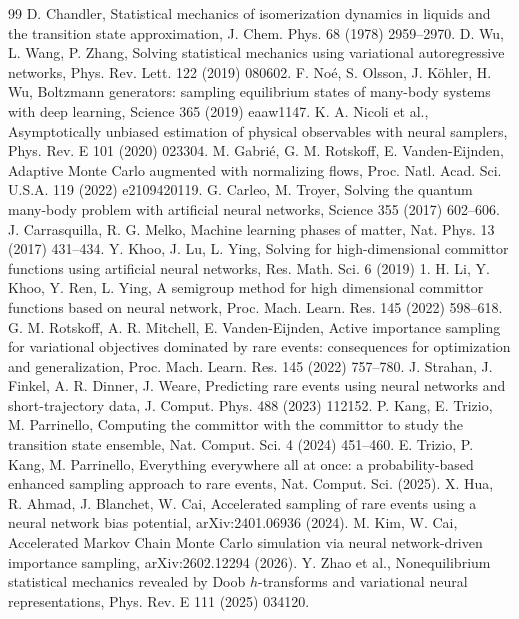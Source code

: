 \documentclass[a4paper,fleqn]{cas-sc}
\begin{document}
\begin{thebibliography}{99}
 D. Chandler, Statistical mechanics of isomerization dynamics in liquids and the transition state approximation, J. Chem. Phys. 68 (1978) 2959--2970.
 D. Wu, L. Wang, P. Zhang, Solving statistical mechanics using variational autoregressive networks, Phys. Rev. Lett. 122 (2019) 080602.
 F. No\'e, S. Olsson, J. K\"ohler, H. Wu, Boltzmann generators: sampling equilibrium states of many-body systems with deep learning, Science 365 (2019) eaaw1147.
 K. A. Nicoli et al., Asymptotically unbiased estimation of physical observables with neural samplers, Phys. Rev. E 101 (2020) 023304.
 M. Gabri\'e, G. M. Rotskoff, E. Vanden-Eijnden, Adaptive Monte Carlo augmented with normalizing flows, Proc. Natl. Acad. Sci. U.S.A. 119 (2022) e2109420119.
 G. Carleo, M. Troyer, Solving the quantum many-body problem with artificial neural networks, Science 355 (2017) 602--606.
 J. Carrasquilla, R. G. Melko, Machine learning phases of matter, Nat. Phys. 13 (2017) 431--434.
 Y. Khoo, J. Lu, L. Ying, Solving for high-dimensional committor functions using artificial neural networks, Res. Math. Sci. 6 (2019) 1.
 H. Li, Y. Khoo, Y. Ren, L. Ying, A semigroup method for high dimensional committor functions based on neural network, Proc. Mach. Learn. Res. 145 (2022) 598--618.
 G. M. Rotskoff, A. R. Mitchell, E. Vanden-Eijnden, Active importance sampling for variational objectives dominated by rare events: consequences for optimization and generalization, Proc. Mach. Learn. Res. 145 (2022) 757--780.
 J. Strahan, J. Finkel, A. R. Dinner, J. Weare, Predicting rare events using neural networks and short-trajectory data, J. Comput. Phys. 488 (2023) 112152.
 P. Kang, E. Trizio, M. Parrinello, Computing the committor with the committor to study the transition state ensemble, Nat. Comput. Sci. 4 (2024) 451--460.
 E. Trizio, P. Kang, M. Parrinello, Everything everywhere all at once: a probability-based enhanced sampling approach to rare events, Nat. Comput. Sci. (2025).
 X. Hua, R. Ahmad, J. Blanchet, W. Cai, Accelerated sampling of rare events using a neural network bias potential, arXiv:2401.06936 (2024).
 M. Kim, W. Cai, Accelerated Markov Chain Monte Carlo simulation via neural network-driven importance sampling, arXiv:2602.12294 (2026).
 Y. Zhao et al., Nonequilibrium statistical mechanics revealed by Doob $h$-transforms and variational neural representations, Phys. Rev. E 111 (2025) 034120.
\end{thebibliography}
\end{document}
